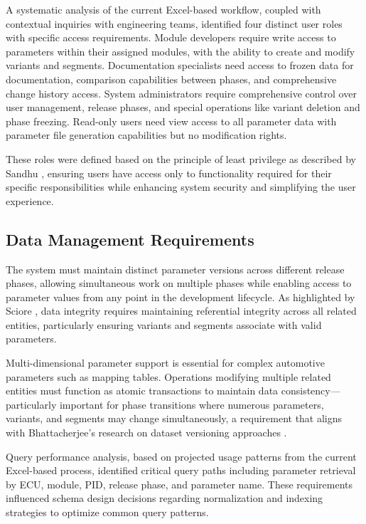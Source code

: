 A systematic analysis of the current Excel-based workflow, coupled with contextual inquiries with engineering teams, identified four distinct user roles with specific access requirements. Module developers require write access to parameters within their assigned modules, with the ability to create and modify variants and segments. Documentation specialists need access to frozen data for documentation, comparison capabilities between phases, and comprehensive change history access. System administrators require comprehensive control over user management, release phases, and special operations like variant deletion and phase freezing. Read-only users need view access to all parameter data with parameter file generation capabilities but no modification rights.

These roles were defined based on the principle of least privilege as described by Sandhu \cite{sandhu1998role}, ensuring users have access only to functionality required for their specific responsibilities while enhancing system security and simplifying the user experience.

\subsection{Data Management Requirements}
\label{subsec:data-management-requirements}

The system must maintain distinct parameter versions across different release phases, allowing simultaneous work on multiple phases while enabling access to parameter values from any point in the development lifecycle. As highlighted by Sciore \cite{sciore2009database}, data integrity requires maintaining referential integrity across all related entities, particularly ensuring variants and segments associate with valid parameters.

Multi-dimensional parameter support is essential for complex automotive parameters such as mapping tables. Operations modifying multiple related entities must function as atomic transactions to maintain data consistency—particularly important for phase transitions where numerous parameters, variants, and segments may change simultaneously, a requirement that aligns with Bhattacherjee's research on dataset versioning approaches \cite{bhattacherjee2015principles}.

Query performance analysis, based on projected usage patterns from the current Excel-based process, identified critical query paths including parameter retrieval by \ac{ECU}, module, \ac{PID}, release phase, and parameter name. These requirements influenced schema design decisions regarding normalization and indexing strategies to optimize common query patterns.

